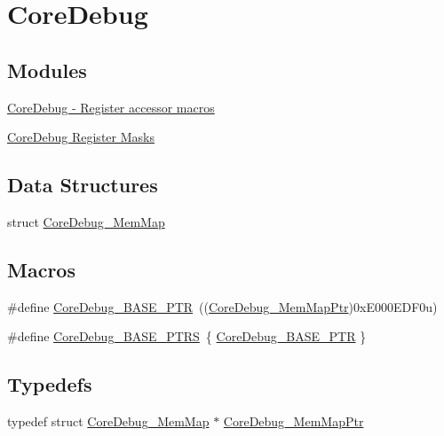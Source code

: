 \hypertarget{group___core_debug___peripheral}{}\section{Core\+Debug}
\label{group___core_debug___peripheral}
\subsection*{Modules}
\begin{DoxyCompactItemize}
\item 
\hyperlink{group___core_debug___register___accessor___macros}{Core\+Debug -\/ Register accessor macros}
\item 
\hyperlink{group___core_debug___register___masks}{Core\+Debug Register Masks}
\end{DoxyCompactItemize}
\subsection*{Data Structures}
\begin{DoxyCompactItemize}
\item 
struct \hyperlink{struct_core_debug___mem_map}{Core\+Debug\+\_\+\+Mem\+Map}
\end{DoxyCompactItemize}
\subsection*{Macros}
\begin{DoxyCompactItemize}
\item 
\#define \hyperlink{group___core_debug___peripheral_ga994a185afca30ede538d89322c4f0326}{Core\+Debug\+\_\+\+B\+A\+S\+E\+\_\+\+P\+T\+R}~((\hyperlink{group___core_debug___peripheral_gaa548220bc91b12bd49065fe752579fcd}{Core\+Debug\+\_\+\+Mem\+Map\+Ptr})0x\+E000\+E\+D\+F0u)
\item 
\#define \hyperlink{group___core_debug___peripheral_gaceec19d257d8b9f9bff5d47d285dec27}{Core\+Debug\+\_\+\+B\+A\+S\+E\+\_\+\+P\+T\+R\+S}~\{ \hyperlink{group___core_debug___peripheral_ga994a185afca30ede538d89322c4f0326}{Core\+Debug\+\_\+\+B\+A\+S\+E\+\_\+\+P\+T\+R} \}
\end{DoxyCompactItemize}
\subsection*{Typedefs}
\begin{DoxyCompactItemize}
\item 
typedef struct \hyperlink{struct_core_debug___mem_map}{Core\+Debug\+\_\+\+Mem\+Map} $\ast$ \hyperlink{group___core_debug___peripheral_gaa548220bc91b12bd49065fe752579fcd}{Core\+Debug\+\_\+\+Mem\+Map\+Ptr}
\end{DoxyCompactItemize}


